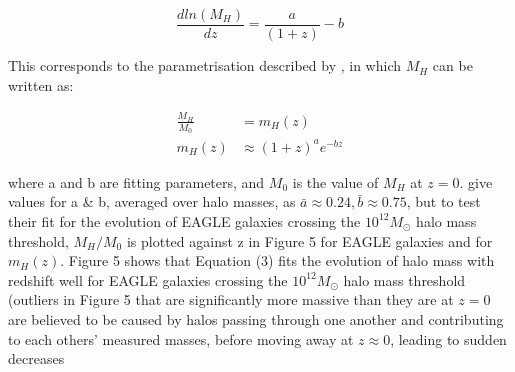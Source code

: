 \documentclass[12pt]{article}%
\begin{document}
\begin{equation}
    \frac{dln(M_H)}{dz}=\frac{a}{(1+z)}-b
\end{equation}

\noindent This corresponds to the parametrisation described by \cite{Correa}, in which $M_H$ can be written as:

\begin{align}
    \frac{M_H}{M_0}&=m_H(z) \nonumber \\
    m_H(z)&\approx(1+z)^ae^{-bz}
\end{align}

\noindent where a and b are fitting parameters, and $M_0$ is the value of $M_H$ at $z=0$. \citeauthor{Correa} give values for a \& b, averaged over halo masses, as $\bar a \approx 0.24, \bar b \approx 0.75$, but to test their fit for the evolution of EAGLE galaxies crossing the $10^{12}M_\odot$ halo mass threshold, $M_H/M_0$ is plotted against z in Figure 5 for EAGLE galaxies and for $m_H(z)$. Figure 5 shows that Equation (3) fits the evolution of halo mass with redshift well for EAGLE galaxies crossing the $10^{12}M_\odot$ halo mass threshold (outliers in Figure 5 that are significantly more massive than they are at $z=0$ are believed to be caused by halos passing through one another and contributing to each others' measured masses, before moving away at $z\approx0$, leading to  sudden decreases

\onecolumngrid
\end{document}
